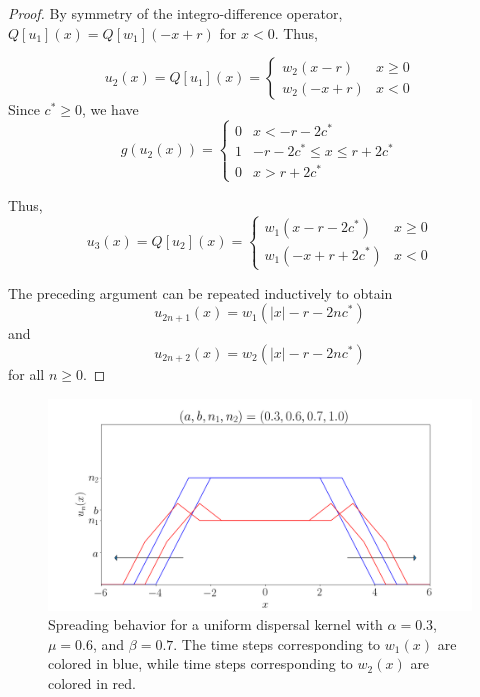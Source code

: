 \documentclass[11pt]{article}
\theoremstyle{definition}
\numberwithin{equation}{section}
\numberwithin{thm}{section}
\begin{document}
\begin{proof}
By symmetry of the integro-difference operator, $Q[u_1](x) = Q[w_1](-x+r)$ for $x<0$. Thus,

\begin{equation}
u_2(x) = Q[u_1](x) = \begin{cases}
w_2(x-r) & x \geq 0 \\
w_2(-x+r) & x < 0 
\end{cases}
\end{equation}
Since $c^*\geq 0$, we have
\begin{equation}
g(u_2(x)) = \begin{cases}
0 & x < -r-2c^* \\
1 & -r-2c^* \leq x \leq r+2c^* \\
0 & x > r+2c^* 
\end{cases}
\end{equation}

Thus,
\begin{equation}
u_3(x) = Q[u_2](x) = \begin{cases}
w_1(x-r-2c^*) & x \geq 0 \\
w_1(-x+r+2c^*) & x < 0 
\end{cases}
\end{equation}

The preceding argument can be repeated inductively to obtain
\begin{equation}
u_{2n+1}(x) = w_1(|x|-r-2nc^*)
\end{equation}
and
\begin{equation}
u_{2n+2}(x) = w_2(|x|-r-2nc^*)
\end{equation}
for all $n\geq 0$.
\end{proof}

\begin{figure}[h!] 
\centering
  \caption{Spreading behavior for a uniform dispersal kernel with $\alpha=0.3$, $\mu=0.6$, and $\beta=0.7$. The time steps corresponding to $w_1(x)$ are colored in blue, while time steps corresponding to $w_2(x)$ are colored in red.}
\label{fig5}
  \includegraphics[width=.8\linewidth]{figures/fig5.png}
\end{figure}
\end{document}
